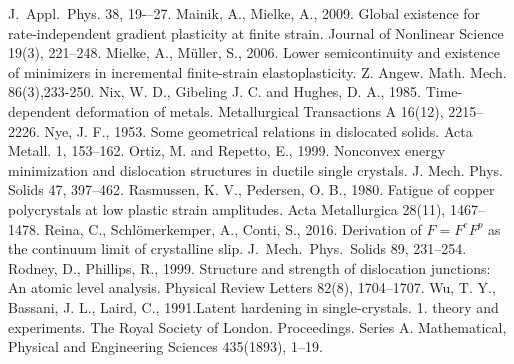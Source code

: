\documentclass[11pt,reqno]{amsart}
\theoremstyle{plain}
\theoremstyle{definition}
\theoremstyle{remark}
\begin{document}
\begin{thebibliography}{100}
J.~Appl.~Phys. 38, 19-–27.
Mainik, A., Mielke, A., 2009. Global existence for rate-independent gradient plasticity at finite strain. Journal of Nonlinear Science 19(3), 221--248.
 Mielke, A., M\"uller, S., 2006. Lower semicontinuity and existence of minimizers in incremental finite-strain elastoplasticity. Z. Angew. Math. Mech. 86(3),233-250.
 Nix, W. D., Gibeling J. C. and Hughes, D. A., 1985. Time-dependent deformation of metals. Metallurgical
Transactions A 16(12), 2215–2226.
 Nye, J. F., 1953. Some geometrical relations in dislocated solids. Acta Metall. 1, 153--162.
 Ortiz, M. and Repetto, E., 1999. Nonconvex energy minimization and dislocation structures in ductile single crystals. J. Mech. Phys. Solids 47, 397--462.
Rasmussen, K. V., Pedersen, O. B., 1980. Fatigue of copper polycrystals at low plastic strain amplitudes. Acta Metallurgica 28(11), 1467--1478.
 Reina, C., Schl\"{o}merkemper, A., Conti, S., 2016. Derivation of $F = F^eF^p$ as the continuum limit of
crystalline slip. J.~Mech.~Phys.~Solids 89, 231--254.
Rodney, D., Phillips, R., 1999. Structure and strength of dislocation junctions: An atomic level analysis. Physical Review Letters 82(8), 1704--1707.
Wu, T. Y., Bassani, J. L., Laird, C., 1991.Latent hardening in single-crystals. 1. theory and
experiments. The Royal Society of London. Proceedings.
  Series A. Mathematical, Physical and Engineering Sciences 435(1893), 1--19.
\end{thebibliography}
\end{document}
